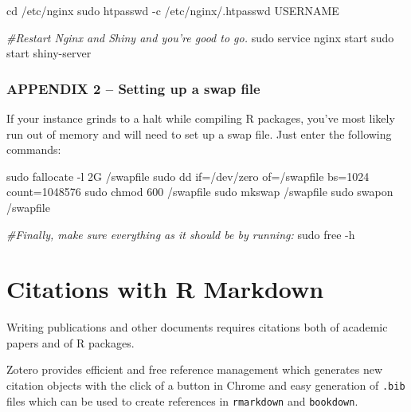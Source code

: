 \documentclass[
]{book}
\newenvironment{Shaded}{\begin{snugshade}}{\end{snugshade}}
\newcommand{\AttributeTok}[1]{\textcolor[rgb]{0.77,0.63,0.00}{#1}}
\newcommand{\BuiltInTok}[1]{#1}
\newcommand{\CommentTok}[1]{\textcolor[rgb]{0.56,0.35,0.01}{\textit{#1}}}
\newcommand{\FunctionTok}[1]{\textcolor[rgb]{0.00,0.00,0.00}{#1}}
\newcommand{\NormalTok}[1]{#1}
\begin{document}
\begin{Shaded}
\begin{Highlighting}[]

\BuiltInTok{cd}\NormalTok{ /etc/nginx}
\FunctionTok{sudo}\NormalTok{ htpasswd }\AttributeTok{{-}c}\NormalTok{ /etc/nginx/.htpasswd USERNAME}

\CommentTok{\#Restart Nginx and Shiny and you’re good to go.}
\FunctionTok{sudo}\NormalTok{ service nginx start}
\FunctionTok{sudo}\NormalTok{ start shiny{-}server}
\end{Highlighting}
\end{Shaded}

\hypertarget{appendix-2-setting-up-a-swap-file}{%
\subsection{APPENDIX 2 -- Setting up a swap file}\label{appendix-2-setting-up-a-swap-file}}

If your instance grinds to a halt while compiling R packages, you've most likely run out of memory and will need to set up a swap file. Just enter the following commands:

\begin{Shaded}
\begin{Highlighting}[]

\FunctionTok{sudo}\NormalTok{ fallocate }\AttributeTok{{-}l}\NormalTok{ 2G /swapfile}
\FunctionTok{sudo}\NormalTok{ dd if=/dev/zero of=/swapfile bs=1024 count=1048576}
\FunctionTok{sudo}\NormalTok{ chmod 600 /swapfile}
\FunctionTok{sudo}\NormalTok{ mkswap /swapfile}
\FunctionTok{sudo}\NormalTok{ swapon /swapfile}

\CommentTok{\#Finally, make sure everything as it should be by running:}
\FunctionTok{sudo}\NormalTok{ free }\AttributeTok{{-}h}
\end{Highlighting}
\end{Shaded}

\hypertarget{citations-with-r-markdown}{%
\chapter{Citations with R Markdown}\label{citations-with-r-markdown}}

Writing publications and other documents requires citations both of academic papers and of R packages.

Zotero provides efficient and free reference management which generates new citation objects with the click of a button in Chrome and easy generation of \texttt{.bib} files which can be used to create references in \texttt{rmarkdown} and \texttt{bookdown}.
\end{document}
